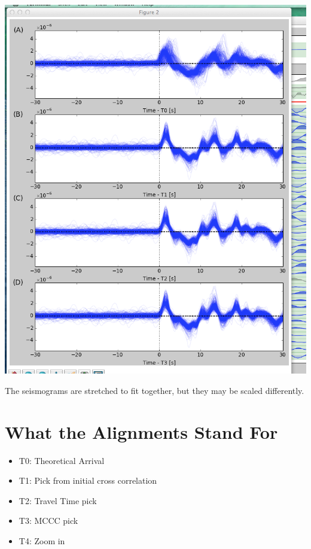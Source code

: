 \documentclass[letterpaper,10pt,english]{sphinxmanual}
\begin{document}
\includegraphics{SACP2_popup.png}

The seismograms are stretched to fit together, but they may be scaled differently.


\section{What the Alignments Stand For}
\label{docfiles/PickingTravelTimes:what-the-alignments-stand-for}\begin{itemize}
\item {} 
T0: Theoretical Arrival

\item {} 
T1: Pick from initial cross correlation

\item {} 
T2: Travel Time pick

\item {} 
T3: MCCC pick

\item {} 
T4: Zoom in

\end{itemize}
\end{document}
